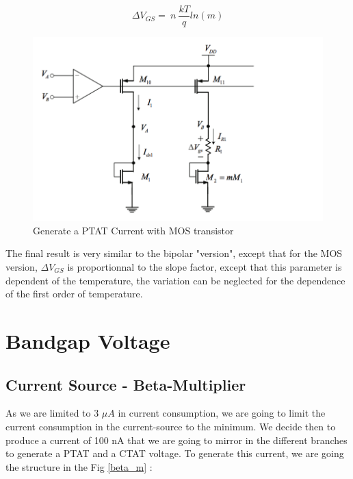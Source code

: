 \documentclass[11pt,a4paper]{report}
\begin{document}
\begin{equation}
  \Delta V_{GS} = ~n~\frac{kT}{q}ln(m)
\end{equation} 

\begin{figure}[h]
  \begin{center}
    \includegraphics[scale=0.3]{photo/PTAT_MOS}
  \end{center}
  \caption{Generate a PTAT Current with MOS transistor}
  \label{PTAT_MOS}
\end{figure}

The final result is very similar to the bipolar "version", except that for the MOS version, $\Delta V_{GS}$ is proportionnal to the slope factor, except that this parameter is dependent of the temperature, the variation can be neglected for the dependence of the first order of temperature. 

\chapter{Bandgap Voltage}
\section{Current Source - Beta-Multiplier}

As we are limited to 3 $\mu A$ in current consumption, we are going to limit the current consumption in the current-source to the minimum. We decide then to produce a current of 100 nA that we are going to mirror in the different branches to generate a PTAT and a CTAT voltage. To generate this current, we are going the structure in the Fig \ref{beta_m} :
\end{document}
